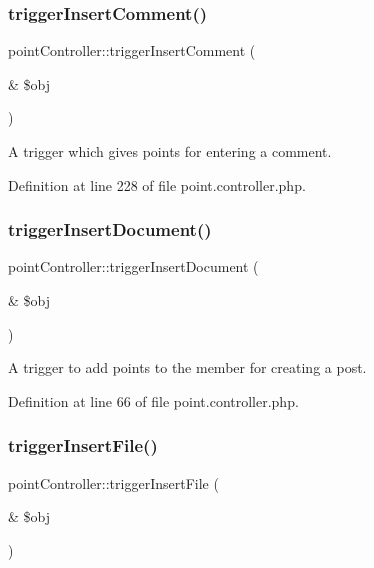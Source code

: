 \subsubsection{\texorpdfstring{trigger\+Insert\+Comment()}{triggerInsertComment()}}
{\footnotesize\ttfamily point\+Controller\+::trigger\+Insert\+Comment (\begin{DoxyParamCaption}\item[{\&}]{\$obj }\end{DoxyParamCaption})}



A trigger which gives points for entering a comment. 



Definition at line 228 of file point.\+controller.\+php.

\hypertarget{classpointController_aba87f873c4b2d31e70a9b326e1e6e753}{}\label{classpointController_aba87f873c4b2d31e70a9b326e1e6e753} 
\subsubsection{\texorpdfstring{trigger\+Insert\+Document()}{triggerInsertDocument()}}
{\footnotesize\ttfamily point\+Controller\+::trigger\+Insert\+Document (\begin{DoxyParamCaption}\item[{\&}]{\$obj }\end{DoxyParamCaption})}



A trigger to add points to the member for creating a post. 



Definition at line 66 of file point.\+controller.\+php.

\hypertarget{classpointController_a48e790691506d5c5a6feac45e7237e3d}{}\label{classpointController_a48e790691506d5c5a6feac45e7237e3d} 
\subsubsection{\texorpdfstring{trigger\+Insert\+File()}{triggerInsertFile()}}
{\footnotesize\ttfamily point\+Controller\+::trigger\+Insert\+File (\begin{DoxyParamCaption}\item[{\&}]{\$obj }\end{DoxyParamCaption})}



